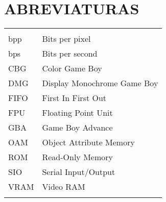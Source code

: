 


\setcounter{secnumdepth}{3} %
\setcounter{tocdepth}{3} %



\tableofcontents
\listoffigures %
\listoftables %
\lstlistoflistings %





\clearpage
\vspace{0.2cm}
\section*{ABREVIATURAS}

\begin{tabular}{ l   |    l  }
	

&\\
bpp & Bits per pixel \\ 
bps & Bits per second \\ 
CBG & Color Game Boy \\ 
DMG & Display Monochrome Game Boy \\ 
FIFO & First In First Out \\ 
FPU & Floating Point Unit \\ 
GBA & Game Boy Advance \\
OAM & Object Attribute Memory \\ 
ROM & Read-Only Memory \\ 
SIO & Serial Input/Output \\ 
VRAM & Video RAM \\
      &\\

\end{tabular}


